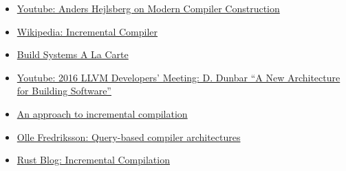 \documentclass[12pt, a4paper]{report}
\begin{document}
\begin{itemize}[noitemsep]
\item \href{https://www.youtube.com/watch?v=wSdV1M7n4gQ}{\Square Youtube: Anders Hejlsberg on Modern Compiler Construction}

\item \href{https://en.wikipedia.org/wiki/Incremental_compiler}{\CheckedBox Wikipedia: Incremental Compiler}

\item \href{https://www.microsoft.com/en-us/research/publication/build-systems-la-carte/}{\Square Build Systems A La Carte}

\item \href{https://www.youtube.com/watch?v=b_T-eCToX1I}{\Square Youtube: 2016 LLVM Developers’ Meeting: D. Dunbar “A New Architecture for Building Software”}

\item \href{https://dl.acm.org/doi/10.1145/502949.502889}{\Square An approach to incremental compilation}

\item \href{https://ollef.github.io/blog/posts/query-based-compilers.html}{\CheckedBox Olle Fredriksson: Query-based compiler architectures}

\item \href{https://blog.rust-lang.org/2016/09/08/incremental.html}{\CheckedBox Rust Blog: Incremental Compilation}


\end{itemize}
\end{document}
